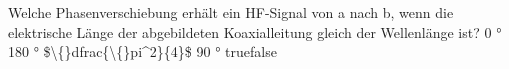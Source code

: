     {Welche Phasenverschiebung erhält ein HF-Signal von a nach b, wenn die elektrische Länge der abgebildeten Koaxialleitung gleich der Wellenlänge ist?  }
    {0 °}
    {180 °}
    {\$\textbackslash\{\}dfrac\{\textbackslash\{\}pi\textasciicircum{}2\}\{4\}\$}
    {90 °}
    {true}{false}